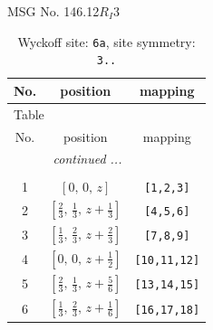 \documentclass[fleqn,8pt]{jsarticle}
\begin{document}
\setcounter{MaxMatrixCols}{32}

\renewcommand{\tablename}{Table~}
\renewcommand{\figurename}{Figure~}
\begin{center}
\LARGE
MSG No. 146.12\quad$R_{I}3$
\end{center}
\renewcommand{\arraystretch}{1.2}
\begin{longtable}{ccc}
\caption{Wyckoff site: {\tt 6a}, site symmetry: {\tt 3..}}
 \\
 \hline \hline
No. & position & mapping \\ \hline \endfirsthead

\multicolumn{2}{l}{\tablename\ \thetable{}} \\
 \hline \hline
No. & position & mapping \\ \hline \endhead

 \hline \hline
\multicolumn{2}{r}{\footnotesize\it continued ...} \\ \endfoot

 \hline \hline
\multicolumn{2}{r}{} \\ \endlastfoot

1 & $\left[ 0,\, 0,\, z \right]$ & {\tt [1,2,3]} \\ \hline
2 & $\left[ \frac{2}{3},\, \frac{1}{3},\, z + \frac{1}{3} \right]$ & {\tt [4,5,6]} \\ \hline
3 & $\left[ \frac{1}{3},\, \frac{2}{3},\, z + \frac{2}{3} \right]$ & {\tt [7,8,9]} \\ \hline
4 & $\left[ 0,\, 0,\, z + \frac{1}{2} \right]$ & {\tt [10,11,12]} \\ \hline
5 & $\left[ \frac{2}{3},\, \frac{1}{3},\, z + \frac{5}{6} \right]$ & {\tt [13,14,15]} \\ \hline
6 & $\left[ \frac{1}{3},\, \frac{2}{3},\, z + \frac{1}{6} \right]$ & {\tt [16,17,18]} \\
\end{longtable}
\renewcommand{\arraystretch}{1.2}
\end{document}
